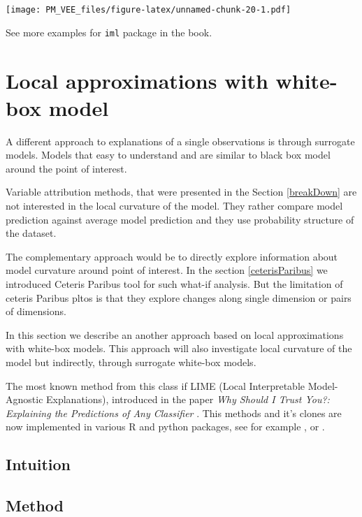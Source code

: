 \documentclass[]{krantz}
\theoremstyle{definition}
\theoremstyle{definition}
\theoremstyle{definition}
\theoremstyle{remark}
\begin{document}
\texttt{[image: PM\_VEE\_files/figure-latex/unnamed-chunk-20-1.pdf]}

See more examples for \texttt{iml} package in the \citep{molnar} book.

\hypertarget{LIME}{%
\section{Local approximations with white-box model}\label{LIME}}

A different approach to explanations of a single observations is through
surrogate models. Models that easy to understand and are similar to
black box model around the point of interest.

Variable attribution methods, that were presented in the Section
\ref{breakDown} are not interested in the local curvature of the model.
They rather compare model prediction against average model prediction
and they use probability structure of the dataset.

The complementary approach would be to directly explore information
about model curvature around point of interest. In the section
\ref{ceterisParibus} we introduced Ceteris Paribus tool for such what-if
analysis. But the limitation of ceteris Paribus pltos is that they
explore changes along single dimension or pairs of dimensions.

In this section we describe an another approach based on local
approximations with white-box models. This approach will also
investigate local curvature of the model but indirectly, through
surrogate white-box models.

The most known method from this class if LIME (Local Interpretable
Model-Agnostic Explanations), introduced in the paper \emph{Why Should I
Trust You?: Explaining the Predictions of Any Classifier} \citep{lime}.
This methods and it's clones are now implemented in various R and python
packages, see for example \citep{R-lime}, \citep{R-live} or
\citep{R-iml}.

\hypertarget{intuition-4}{%
\subsection{Intuition}\label{intuition-4}}

\hypertarget{method-4}{%
\subsection{Method}\label{method-4}}
\end{document}

